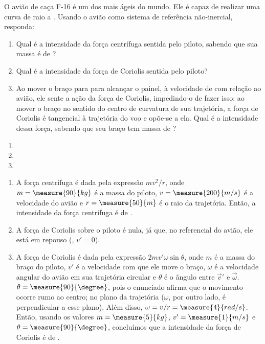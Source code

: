 \begin{question}
    O avião de caça F-16  é um dos mais ágeis do mundo.
    Ele é capaz de realizar uma curva de raio  a .
    Usando o avião como sistema de referência não-inercial, responda:
    \begin{enumerate}
      \item Qual é a intensidade da força centrífuga sentida pelo piloto, sabendo que sua massa é de ?
      \item Qual é a intensidade da força de Coriolis sentida pelo piloto?
      \item Ao mover o braço para para alcançar o painel, à velocidade de  com relação ao avião, ele sente a ação da força de Coriolis, impedindo-o de fazer isso: ao mover o braço no sentido do centro de curvatura de sua trajetória, a força de Coriolis é tangencial à trajetória do voo e opõe-se a ela.
      Qual é a intensidade dessa força, sabendo que seu braço tem massa de ?
    \end{enumerate}

    \begin{answer}
      \begin{enumerate}
        \item {}
        \item {}
        \item {}
      \end{enumerate}
    \end{answer}

    \begin{solution}
      \begin{enumerate}
        \item A força centrífuga é dada pela expressão $mv^2/r$, onde $m = \measure{90}{kg}$ é a massa do piloto, $v = \measure{200}{m/s}$ é a velocidade do avião e $r = \measure{50}{m}$ é o raio da trajetória.
        Então, a intensidade da força centrífuga é de .
        \item A força de Coriolis sobre o piloto é nula, já que, no referencial do avião, ele está em repouso (\ie, $v' = 0$).
        \item A força de Coriolis é dada pela expressão $2mv'\omega\sin\theta$, onde $m$ é a massa do braço do piloto, $v'$ é a velocidade com que ele move o braço, $\omega$ é a velocidade angular do avião em sua trajetória circular e $\theta$ é o ângulo entre $\vec v'$ e $\vec\omega$.
        $\theta = \measure{90}{\degree}$, pois o enunciado afirma que o movimento ocorre rumo ao centro; no plano da trajetória ($\omega$, por outro lado, é perpendicular a esse plano).
        Além disso, $\omega = v/r = \measure{4}{rad/s}$.
        Então, usando os valores $m = \measure{5}{kg}$, $v' = \measure{1}{m/s}$ e $\theta = \measure{90}{\degree}$, concluímos que a intensidade da força de Coriolis é de .
      \end{enumerate}
    \end{solution}
\end{question}